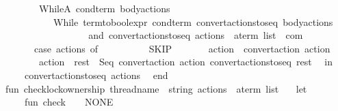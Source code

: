 \begin{isabellebody}
\ \ \ \ \ \ {\isacharbar}{\kern0pt}\ WhileA\ {\isacharparenleft}{\kern0pt}cond{\isacharunderscore}{\kern0pt}term{\isacharcomma}{\kern0pt}\ body{\isacharunderscore}{\kern0pt}actions{\isacharparenright}{\kern0pt}\ {\isacharequal}{\kern0pt}{\isachargreater}{\kern0pt}\isanewline
\ \ \ \ \ \ \ \ \ \ While\ {\isacharparenleft}{\kern0pt}term{\isacharunderscore}{\kern0pt}to{\isacharunderscore}{\kern0pt}bool{\isacharunderscore}{\kern0pt}expr\ cond{\isacharunderscore}{\kern0pt}term{\isacharcomma}{\kern0pt}\ convert{\isacharunderscore}{\kern0pt}actions{\isacharunderscore}{\kern0pt}to{\isacharunderscore}{\kern0pt}seq\ body{\isacharunderscore}{\kern0pt}actions{\isacharparenright}{\kern0pt}\isanewline
\ \ \ \ \ \ \ \ \isanewline
\ \ \ \ \isanewline
\ \ \ \ and\ convert{\isacharunderscore}{\kern0pt}actions{\isacharunderscore}{\kern0pt}to{\isacharunderscore}{\kern0pt}seq\ {\isacharparenleft}{\kern0pt}actions\ {\isacharcolon}{\kern0pt}\ a{\isacharunderscore}{\kern0pt}term\ list{\isacharparenright}{\kern0pt}\ {\isacharcolon}{\kern0pt}\ com\ {\isacharequal}{\kern0pt}\isanewline
\ \ \ \ \ \ case\ actions\ of\isanewline
\ \ \ \ \ \ \ \ {\isacharbrackleft}{\kern0pt}{\isacharbrackright}{\kern0pt}\ {\isacharequal}{\kern0pt}{\isachargreater}{\kern0pt}\ SKIP\isanewline
\ \ \ \ \ \ {\isacharbar}{\kern0pt}\ {\isacharbrackleft}{\kern0pt}action{\isacharbrackright}{\kern0pt}\ {\isacharequal}{\kern0pt}{\isachargreater}{\kern0pt}\ convert{\isacharunderscore}{\kern0pt}action\ action\isanewline
\ \ \ \ \ \ {\isacharbar}{\kern0pt}\ action\ {\isacharcolon}{\kern0pt}{\isacharcolon}{\kern0pt}\ rest\ {\isacharequal}{\kern0pt}{\isachargreater}{\kern0pt}\ Seq\ {\isacharparenleft}{\kern0pt}convert{\isacharunderscore}{\kern0pt}action\ action{\isacharcomma}{\kern0pt}\ convert{\isacharunderscore}{\kern0pt}actions{\isacharunderscore}{\kern0pt}to{\isacharunderscore}{\kern0pt}seq\ rest{\isacharparenright}{\kern0pt}\isanewline
\ \ in\isanewline
\ \ \ \ convert{\isacharunderscore}{\kern0pt}actions{\isacharunderscore}{\kern0pt}to{\isacharunderscore}{\kern0pt}seq\ actions\isanewline
\ \ end\isanewline
\isanewline
fun\ check{\isacharunderscore}{\kern0pt}lock{\isacharunderscore}{\kern0pt}ownership\ {\isacharparenleft}{\kern0pt}thread{\isacharunderscore}{\kern0pt}name\ {\isacharcolon}{\kern0pt}\ string{\isacharparenright}{\kern0pt}\ {\isacharparenleft}{\kern0pt}actions\ {\isacharcolon}{\kern0pt}\ a{\isacharunderscore}{\kern0pt}term\ list{\isacharparenright}{\kern0pt}\ {\isacharequal}{\kern0pt}\isanewline
\ \ let\isanewline
\ \ \ \ fun\ check\ {\isacharbrackleft}{\kern0pt}{\isacharbrackright}{\kern0pt}\ {\isacharunderscore}{\kern0pt}\ {\isacharequal}{\kern0pt}\ NONE\isanewline

\end{isabellebody}
